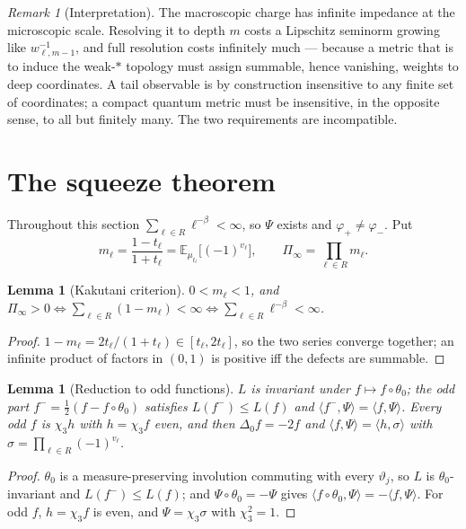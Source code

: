 \documentclass[11pt]{amsart}
\numberwithin{equation}{section}
\newtheorem{lemma}[theorem]{Lemma}
\theoremstyle{definition}
\theoremstyle{remark}
\newtheorem{remark}[theorem]{Remark}
\begin{document}
\begin{remark}[Interpretation]\label{rem:impedance}
The macroscopic charge has infinite impedance at the microscopic scale. Resolving it to depth
$m$ costs a Lipschitz seminorm growing like $w_{\ell,m-1}^{-1}$, and full resolution costs
infinitely much --- because a metric that is to induce the weak-$*$ topology must assign
summable, hence vanishing, weights to deep coordinates. A tail observable is by construction
insensitive to any finite set of coordinates; a compact quantum metric must be insensitive,
in the opposite sense, to all but finitely many. The two requirements are incompatible.
\end{remark}

\section{The squeeze theorem}

Throughout this section $\sum_{\ell\in R}\ell^{-\beta}<\infty$, so $\Psi$ exists and
$\varphi_+\ne\varphi_-$. Put
\begin{equation}\label{eq:Pi}
m_\ell=\frac{1-t_\ell}{1+t_\ell}=\mathbb E_{\mu_{t_\ell}}\bigl[(-1)^{v_\ell}\bigr],
\qquad \Pi_\infty=\prod_{\ell\in R}m_\ell .
\end{equation}

\begin{lemma}[Kakutani criterion]\label{lem:kakutani}
$0<m_\ell<1$, and $\Pi_\infty>0\iff\sum_{\ell\in R}(1-m_\ell)<\infty\iff\sum_{\ell\in R}\ell^{-\beta}<\infty$.
\end{lemma}

\begin{proof}
$1-m_\ell=2t_\ell/(1+t_\ell)\in[t_\ell,2t_\ell]$, so the two series converge together; an
infinite product of factors in $(0,1)$ is positive iff the defects are summable.
\end{proof}

\begin{lemma}[Reduction to odd functions]\label{lem:odd}
$L$ is invariant under $f\mapsto f\circ\theta_0$; the odd part
$f^-=\tfrac12(f-f\circ\theta_0)$ satisfies $L(f^-)\le L(f)$ and
$\langle f^-,\Psi\rangle=\langle f,\Psi\rangle$. Every odd $f$ is $\chi_3h$ with
$h=\chi_3f$ even, and then $\Delta_0f=-2f$ and
$\langle f,\Psi\rangle=\langle h,\sigma\rangle$ with $\sigma=\prod_{\ell\in R}(-1)^{v_\ell}$.
\end{lemma}

\begin{proof}
$\theta_0$ is a measure-preserving involution commuting with every $\vartheta_j$, so $L$ is
$\theta_0$-invariant and $L(f^-)\le L(f)$; and $\Psi\circ\theta_0=-\Psi$ gives
$\langle f\circ\theta_0,\Psi\rangle=-\langle f,\Psi\rangle$. For odd $f$, $h=\chi_3f$ is
even, and $\Psi=\chi_3\sigma$ with $\chi_3^2=1$.
\end{proof}
\end{document}
